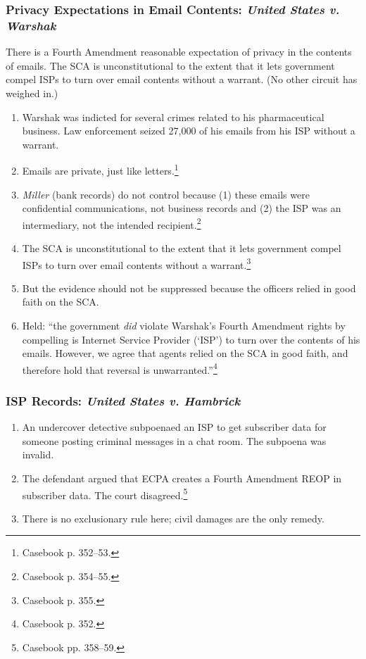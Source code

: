 \subsubsection{Privacy Expectations in Email Contents: \emph{United States v. 
Warshak}}

There is a Fourth Amendment reasonable expectation of privacy in the contents 
of emails. The SCA is unconstitutional to the extent that it lets government 
compel ISPs to turn over email contents without a warrant. (No other circuit 
has weighed in.)

\begin{enumerate}
    \item Warshak was indicted for several crimes related to his 
    pharmaceutical business. Law enforcement seized 27,000 of his emails from 
    his ISP without a warrant.
    \item Emails are private, just like letters.\footnote{Casebook p. 352--53.}
    \item \emph{Miller} (bank records) do not control because (1) these emails 
    were confidential communications, not business records and (2) the ISP was 
    an intermediary, not the intended recipient.\footnote{Casebook p. 354--55.}
    \item The SCA is unconstitutional to the extent that it lets government 
    compel ISPs to turn over email contents without a 
    warrant.\footnote{Casebook p. 355.}
    \item But the evidence should not be suppressed because the officers 
    relied in good faith on the SCA.
    \item Held: ``the government \emph{did} violate Warshak's Fourth Amendment 
    rights by compelling is Internet Service Provider (`ISP') to turn over the 
    contents of his emails. However, we agree that agents relied on the SCA in 
    good faith, and therefore hold that reversal is 
    unwarranted.''\footnote{Casebook p. 352.}
\end{enumerate}

\subsubsection{ISP Records: \emph{United States v. Hambrick}}


\begin{enumerate}
    \item An undercover detective subpoenaed an ISP to get subscriber data for 
    someone posting criminal messages in a chat room. The subpoena was 
    invalid.
    \item The defendant argued that ECPA creates a Fourth Amendment REOP in 
    subscriber data. The court disagreed.\footnote{Casebook pp. 358--59.}
    \item There is no exclusionary rule here; civil damages are the only 
    remedy.
\end{enumerate}

